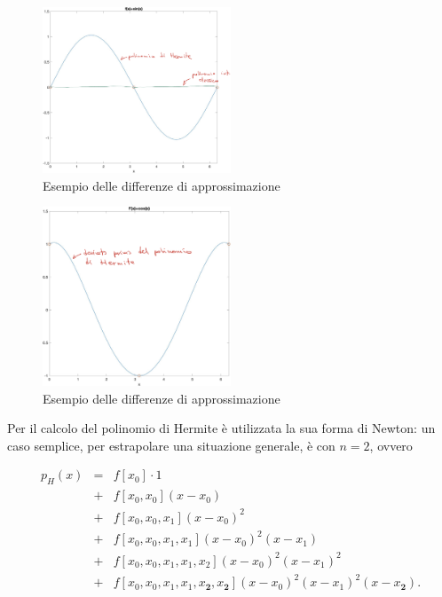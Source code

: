\begin{figure}
\centering
\includegraphics[width=0.5\textwidth]{immagini/PolHermite.png}
\caption{\label{fig:PolHermite} Esempio delle differenze di approssimazione}
\end{figure}
\begin{figure}
\centering
\includegraphics[width=0.5\textwidth]{immagini/PolHermite-1.png}
\caption{\label{fig:PolHermite1} Esempio delle differenze di approssimazione}
\end{figure}

\begin{remark}
    Per il calcolo del polinomio di Hermite è utilizzata la sua forma di Newton: un caso semplice, per estrapolare una situazione generale, è con $n=2$, ovvero

    \begin{equation*}
        \begin{matrix}
            p_H(x)&=& f[x_0]\cdot 1\\
            &+& f[x_0,x_0](x-x_0)\\
            &+& f[x_0,x_0,x_1](x-x_0)^2\\
            &+& f[x_0,x_0,x_1,x_1](x-x_0)^2(x-x_1)\\
            &+& f[x_0,x_0,x_1,x_1,x_2](x-x_0)^2(x-x_1)^2\\
            &+& f[x_0,x_0,x_1,x_1,x_{\boldsymbol 2},x_{\boldsymbol 2}](x-x_0)^2(x-x_1)^2(x-x_{\boldsymbol 2}).
        \end{matrix}
    \end{equation*}
\end{remark}

